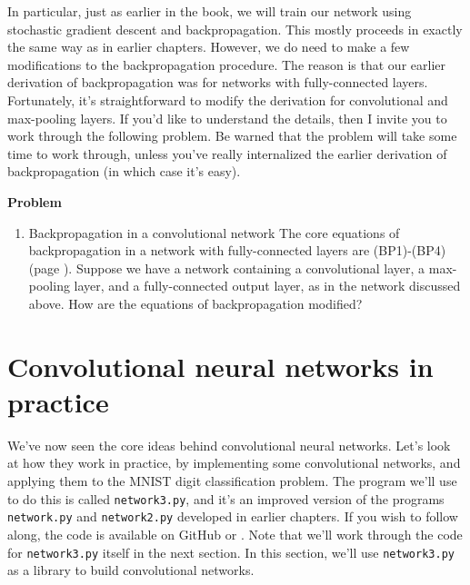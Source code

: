 In particular, just as earlier in the book, we will train our network using stochastic gradient descent and backpropagation. This mostly proceeds in exactly the same way as in earlier chapters. However, we do need to make a few modifications to the backpropagation procedure. The reason is that our earlier derivation of backpropagation was for networks with fully-connected layers. Fortunately, it's straightforward to modify the derivation for convolutional and max-pooling layers. If you'd like to understand the details, then I invite you to work through the following problem. Be warned that the problem will take some time to work through, unless you've really internalized the earlier derivation of backpropagation (in which case it's easy).

\textbf{Problem}


\begin{enumerate}
\item Backpropagation in a convolutional network The core equations of backpropagation in a network with fully-connected layers are (BP1)-(BP4) (page \pageref{page:BPEquations}). Suppose we have a network containing a convolutional layer, a max-pooling layer, and a fully-connected output layer, as in the network discussed above. How are the equations of backpropagation modified? 
    
\end{enumerate}

\section{Convolutional neural networks in practice}

We've now seen the core ideas behind convolutional neural networks. Let's look at how they work in practice, by implementing some convolutional networks, and applying them to the MNIST digit classification problem. The program we'll use to do this is called \lstinline{network3.py}, and it's an improved version of the programs \lstinline{network.py} and \lstinline{network2.py} developed in earlier chapters. If you wish to follow along, the code is available on GitHub \cite{Nielsengithub2019} or \cite{MDDobrzanskigithub2019}. Note that we'll work through the code for \lstinline{network3.py} itself in the next section. In this section, we'll use \lstinline{network3.py} as a library to build convolutional networks.

